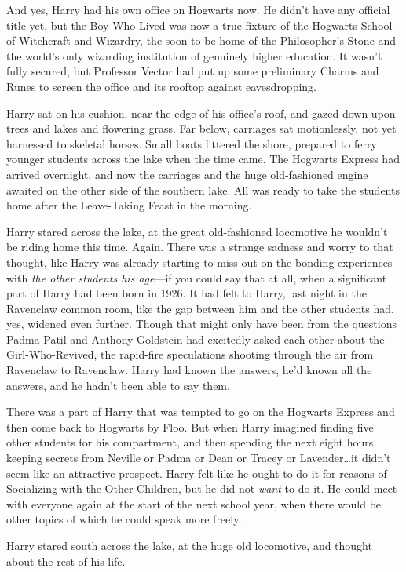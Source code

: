 And yes, Harry had his own office on Hogwarts now. He didn’t have any official title yet, but the Boy-Who-Lived was now a true fixture of the Hogwarts School of Witchcraft and Wizardry, the soon-to-be-home of the Philosopher’s Stone and the world’s only wizarding institution of genuinely higher education. It wasn’t fully secured, but Professor Vector had put up some preliminary Charms and Runes to screen the office and its rooftop against eavesdropping.

Harry sat on his cushion, near the edge of his office’s roof, and gazed down upon trees and lakes and flowering grass. Far below, carriages sat motionlessly, not yet harnessed to skeletal horses. Small boats littered the shore, prepared to ferry younger students across the lake when the time came. The Hogwarts Express had arrived overnight, and now the carriages and the huge old-fashioned engine awaited on the other side of the southern lake. All was ready to take the students home after the Leave-Taking Feast in the morning.

Harry stared across the lake, at the great old-fashioned locomotive he wouldn’t be riding home this time. Again. There was a strange sadness and worry to that thought, like Harry was already starting to miss out on the bonding experiences with \emph{the other students his age}—if you could say that at all, when a significant part of Harry had been born in 1926. It had felt to Harry, last night in the Ravenclaw common room, like the gap between him and the other students had, yes, widened even further. Though that might only have been from the questions Padma Patil and Anthony Goldstein had excitedly asked each other about the Girl-Who-Revived, the rapid-fire speculations shooting through the air from Ravenclaw to Ravenclaw. Harry had known the answers, he’d known all the answers, and he hadn’t been able to say them.

There was a part of Harry that was tempted to go on the Hogwarts Express and then come back to Hogwarts by Floo. But when Harry imagined finding five other students for his compartment, and then spending the next eight hours keeping secrets from Neville or Padma or Dean or Tracey or Lavender…it didn’t seem like an attractive prospect. Harry felt like he ought to do it for reasons of Socializing with the Other Children, but he did not \emph{want} to do it. He could meet with everyone again at the start of the next school year, when there would be other topics of which he could speak more freely.

Harry stared south across the lake, at the huge old locomotive, and thought about the rest of his life.

